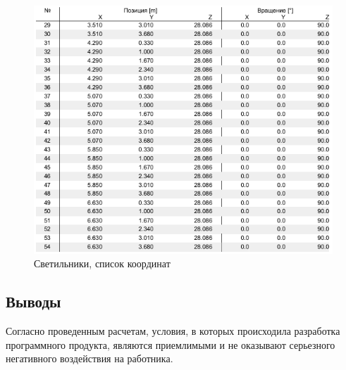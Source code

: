 \begin{figure}[p]
\centering
\includegraphics[width=\textwidth]{lights_5}
\caption{Светильники, список координат}
\label{pic:light_5}
\end{figure}
\FloatBarrier

\subsection*{Выводы}

Согласно проведенным расчетам, условия, в которых происходила разработка программного продукта,
являются приемлимыми и не оказывают серьезного негативного воздействия на работника.
\clearpage

